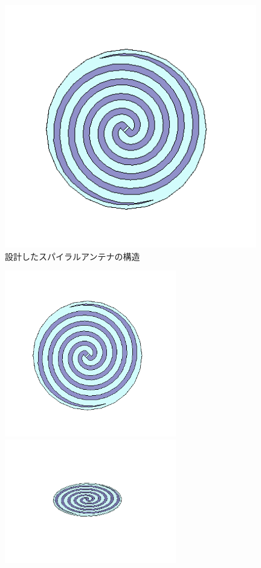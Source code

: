 \documentclass[11pt,a4paper,uplatex,draft]{ujarticle}
\begin{document}
  \begin{figure}[hbtp]
    \centering
    \includegraphics[keepaspectratio, width=110mm]{Images/spiral_antenna_configuration.png}
    \caption{設計したスパイラルアンテナの構造}
    \label{fig:spiral_antenna_configuration}
  \end{figure}

  \begin{figure}[tbp]
    \begin{minipage}[b]{0.5\textwidth}
      \centering
      \includegraphics[keepaspectratio, width=75mm]{Images/spiral_antenna_configuration.png}
    \end{minipage}
    \begin{minipage}[b]{0.5\textwidth}
      \centering
      \includegraphics[keepaspectratio, width=75mm]{Images/spiral_withoutcord.png}
    \end{minipage}
  \end{figure}
\end{document}
